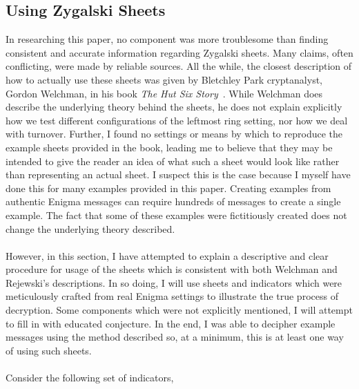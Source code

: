 \subsection{Using Zygalski Sheets}
In researching this paper, no component was more troublesome than
finding consistent and accurate information regarding Zygalski
sheets. Many claims, often conflicting, were made by reliable
sources. All the while, the closest description of how to actually
use these sheets was given by Bletchley Park cryptanalyst, Gordon
Welchman, in his book \emph{The
Hut Six Story}~\cite{Welchman1982HutSix}. While Welchman does describe the underlying theory
behind the sheets, he does not explain explicitly how we test
different configurations of the leftmost ring setting, nor how we
deal with turnover. Further, I found no settings or means by which to
reproduce the example sheets provided in the book, leading me to
believe that they may be intended to give the reader an idea of what
such a sheet would look like rather than representing an actual
sheet. I suspect this is the case because I myself have done this for
many examples provided in this paper. Creating examples from
authentic Enigma messages can require hundreds of messages to create
a single example. The fact that some of these examples were
fictitiously created does not change the underlying theory described.
\\\\However, in this section, I have attempted to explain a
descriptive and clear procedure for usage of the sheets which is
consistent with both Welchman and Rejewski's descriptions. In so doing, I
will use sheets and indicators which were meticulously crafted from
real Enigma settings to illustrate the true process of decryption.
Some components which were not explicitly mentioned, I will attempt to
fill in with educated conjecture. In the end, I was able to decipher
example messages using the method described so, at a minimum, this is
at least one way of using such sheets.
\\\\Consider the following set of indicators,

